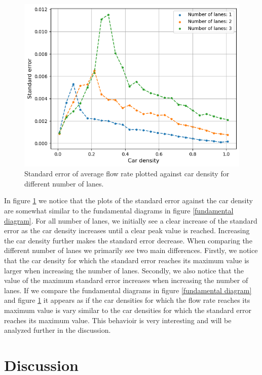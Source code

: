 \documentclass[a4paper,12pt]{article}
\begin{document}
\begin{figure}[H]
    \centering
    \includegraphics[scale=0.9]{Images/standard error 120.png}
    \caption{Standard error of average flow rate plotted against car density for different number of lanes.}
    \label{standard error}
\end{figure}

In figure \ref*{standard error} we notice that the plots of the standard error against the car density are somewhat similar to the fundamental diagrams
in figure \ref*{fundamental diagram}. For all number of lanes, we initially see a clear increase of the standard error as the car density increases
until a clear peak value is reached. Increasing the car density further makes the standard error decrease. When comparing the different number of lanes we primarily
see two main differences. Firstly, we notice that the car density for which the standard error reaches its maximum value is larger when increasing the number of lanes.
Secondly, we also notice that the value of the maximum standard error increases when increasing the number of lanes. If we compare the fundamental
diagrams in figure \ref*{fundamental diagram} and figure \ref*{standard error} it appears as if the car densities for which the flow rate reaches its maximum
value is vary similar to the car densities for which the standard error reaches its maximum value. This behavioir is very interesting and will be analyzed further
in the discussion.

\section*{Discussion}
\end{document}
